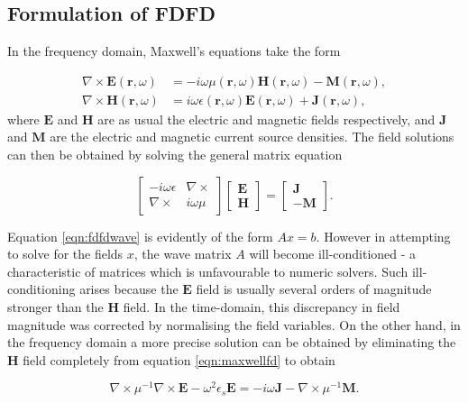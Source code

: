 \subsection{Formulation of FDFD}

In the frequency domain, Maxwell's equations take the form \cite{Shin2012}

\begin{align}
\nabla \times \bm{E}(\bm{r},\omega) &= - i \omega \mu(\bm{r},\omega)\bm{H}(\bm{r},\omega) - \bm{M}(\bm{r},\omega), \label{eqn:maxwellfd}\\
\nabla \times \bm{H}(\bm{r},\omega) &= i \omega \epsilon(\bm{r},\omega)\bm{E}(\bm{r},\omega)+\bm{J}(\bm{r},\omega),
\end{align}
where $\bm{E}$ and $\bm{H}$ are as usual the electric and magnetic fields respectively, and $\bm{J}$ and $\bm{M}$ are the electric and magnetic current source densities. The field solutions can then be obtained by solving the general matrix equation

\begin{equation}
\begin{bmatrix}
-i \omega \epsilon & \nabla \times \\
\nabla \times & i \omega \mu 
\end{bmatrix}
\begin{bmatrix}
\bm{E} \\
\bm{H}
\end{bmatrix}
=
\begin{bmatrix}
\bm{J} \\
\bm{-M}
\end{bmatrix}.
\label{eqn:fdfdwave}
\end{equation}

Equation \ref{eqn:fdfdwave} is evidently of the form $Ax = b$. However in attempting to solve for the fields $x$, the wave matrix $A$ will become ill-conditioned - a characteristic of matrices which is unfavourable to numeric solvers. Such ill-conditioning arises because the $\bm{E}$ field is usually several orders of magnitude stronger than the $\bm{H}$ field. In the time-domain, this discrepancy in field magnitude was corrected by normalising the field variables. On the other hand, in the frequency domain a more precise solution can be obtained by eliminating the $\bm{H}$ field completely from equation \ref{eqn:maxwellfd} to obtain

\begin{equation}
\nabla \times \mu^{-1} \nabla \times \bm{E} - \omega^2 \epsilon_s \bm{E} = -i \omega \bm{J}- \nabla \times \mu^{-1} \bm{M}.
\label{eqn:fdfdmaster}
\end{equation}

